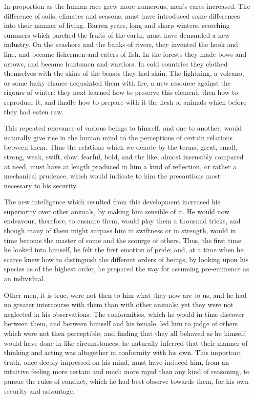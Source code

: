 \documentclass[12pt]{report}
\begin{document}
In proportion as the human race grew more numerous, men's cares increased. The difference of soils, climates and seasons, must have introduced some differences into their manner of living. Barren years, long and sharp winters, scorching summers which parched the fruits of the earth, must have demanded a new industry. On the seashore and the banks of rivers, they invented the hook and line, and became fishermen and eaters of fish. In the forests they made bows and arrows, and became huntsmen and warriors. In cold countries they clothed themselves with the skins of the beasts they had slain. The lightning, a volcano, or some lucky chance acquainted them with fire, a new resource against the rigours of winter: they next learned how to preserve this element, then how to reproduce it, and finally how to prepare with it the flesh of animals which before they had eaten raw.

This repeated relevance of various beings to himself, and one to another, would naturally give rise in the human mind to the perceptions of certain relations between them. Thus the relations which we denote by the terms, great, small, strong, weak, swift, slow, fearful, bold, and the like, almost insensibly compared at need, must have at length produced in him a kind of reflection, or rather a mechanical prudence, which would indicate to him the precautions most necessary to his security.

The new intelligence which resulted from this development increased his superiority over other animals, by making him sensible of it. He would now endeavour, therefore, to ensnare them, would play them a thousand tricks, and though many of them might surpass him in swiftness or in strength, would in time become the master of some and the scourge of others. Thus, the first time he looked into himself, he felt the first emotion of pride; and, at a time when he scarce knew how to distinguish the different orders of beings, by looking upon his species as of the highest order, he prepared the way for assuming pre-eminence as an individual.

Other men, it is true, were not then to him what they now are to us, and he had no greater intercourse with them than with other animals; yet they were not neglected in his observations. The conformities, which he would in time discover between them, and between himself and his female, led him to judge of others which were not then perceptible; and finding that they all behaved as he himself would have done in like circumstances, he naturally inferred that their manner of thinking and acting was altogether in conformity with his own. This important truth, once deeply impressed on his mind, must have induced him, from an intuitive feeling more certain and much more rapid than any kind of reasoning, to pursue the rules of conduct, which he had best observe towards them, for his own security and advantage.
\end{document}
